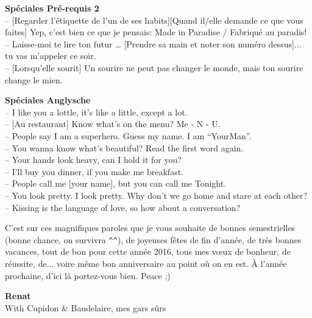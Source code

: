 \documentclass{parch}
\begin{document}
\begin{multicols}{3}
\begin{spacing}{.95}
		\vspace*{3\baselineskip}
		\vspace*{3\baselineskip}
		
		\textbf{Spéciales Pré-requis 2}\\
		-- [Regarder l’étiquette de l’un de ses habits][Quand il/elle demande ce que vous faites] Yep, c’est bien ce que je pensais: Made in Paradise / Fabriqué au paradis!\\
		-- Laisse-moi te lire ton futur … [Prendre sa main et noter son numéro dessus]... tu vas m’appeler ce soir.\\
		-- [Lorsqu’elle sourit] Un sourire ne peut pas changer le monde, mais ton sourire change le mien.
		
		\textbf{Spéciales Anglysche}\\
		-- I like you a lottle, it’s like a little, except a lot.\\
		-- [Au restaurant] Know what’s on the menu? Me - N - U.\\
		-- People say I am a superhero. Guess my name. I am \enquote{YourMan}.\\
		-- You wanna know what’s beautiful? Read the first word again.\\
		-- Your hands look heavy, can I hold it for you?\\
		-- I’ll buy you dinner, if you make me breakfast.\\
		-- People call me [your name], but you can call me Tonight.\\
		-- You look pretty. I look pretty. Why don’t we go home and stare at each other?\\
		-- Kissing is the language of love, so how about a conversation?
		
		C’est sur ces magnifiques paroles que je vous souhaite de bonnes semestrielles (bonne chance, on survivra \verb|^^|), de joyeuses fêtes de fin d’année, de très bonnes vacances, tout de bon pour cette année 2016, tous mes vœux de bonheur, de réussite, de... voire même bon anniversaire au point où on en est. À l’année prochaine, d’ici là portez-vous bien. Peace ;)
		
		\vspace*{1mm}
		\begin{mdframed}[
			skipabove=0mm,
			skipbelow=0mm,
			innerleftmargin=2ex,
			innerrightmargin=2ex,
			innertopmargin=2ex,
			innerbottommargin=2ex,
			rightline=false,
			topline=false,
			bottomline=false,
			linewidth=1mm,
			linecolor=mediumGrey,
			backgroundcolor=lightGrey,
			fontcolor=black,
			]
			\textbf{Renat}\\
			With Cupidon \& Baudelaire, mes gars sûrs
		\end{mdframed}
		
		\end{spacing}
	\end{multicols}
	
\end{document}

